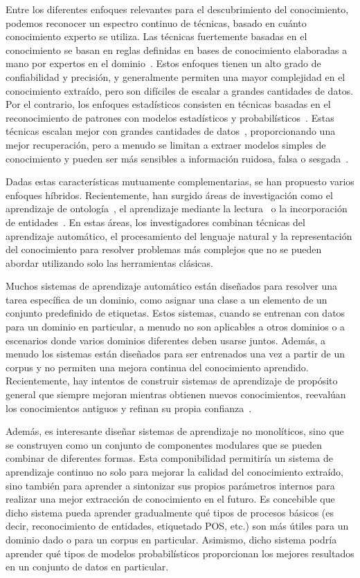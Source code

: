 Entre los diferentes enfoques relevantes para el descubrimiento del conocimiento, podemos reconocer un espectro continuo de técnicas, basado en cuánto conocimiento experto se utiliza. Las técnicas fuertemente basadas en el conocimiento se basan en reglas definidas en bases de conocimiento elaboradas a mano por expertos en el dominio~\cite{chandrasekaran1986generic}. Estos enfoques tienen un alto grado de confiabilidad y precisión, y generalmente permiten una mayor complejidad en el conocimiento extraído, pero son difíciles de escalar a grandes cantidades de datos. Por el contrario, los enfoques estadísticos consisten en técnicas basadas en el reconocimiento de patrones con modelos estadísticos y probabilísticos~\cite{kevin2012machine}. Estas técnicas escalan mejor con grandes cantidades de datos~\cite{le2013building}, proporcionando una mejor recuperación, pero a menudo se limitan a extraer modelos simples de conocimiento y pueden ser más sensibles a información ruidosa, falsa o sesgada~\cite{bolukbasi2016man}.

Dadas estas características mutuamente complementarias, se han propuesto varios enfoques híbridos. Recientemente, han surgido áreas de investigación como el aprendizaje de ontología~\cite{cimiano2009ontology}, el aprendizaje mediante la lectura~\cite{barker2007learning} o la incorporación de entidades~\cite{hu2015entity}.
En estas áreas, los investigadores combinan técnicas del aprendizaje automático, el procesamiento del lenguaje natural y la representación del conocimiento para resolver problemas más complejos que no se pueden abordar utilizando solo las herramientas clásicas.

Muchos sistemas de aprendizaje automático están diseñados para resolver una tarea específica de un dominio, como asignar una clase a un elemento de un conjunto predefinido de etiquetas. Estos sistemas, cuando se entrenan con datos para un dominio en particular, a menudo no son aplicables a otros dominios o a escenarios donde varios dominios diferentes deben usarse juntos. Además, a menudo los sistemas están diseñados para ser entrenados una vez a partir de un corpus y no permiten una mejora continua del conocimiento aprendido. Recientemente, hay intentos de construir sistemas de aprendizaje de propósito general que siempre mejoran mientras obtienen nuevos conocimientos, reevalúan los conocimientos antiguos y refinan su propia confianza~\cite{mitchell2015never}.

Además, es interesante diseñar sistemas de aprendizaje no monolíticos, sino que se construyen como un conjunto de componentes modulares que se pueden combinar de diferentes formas. Esta componibilidad permitiría un sistema de aprendizaje continuo no solo para mejorar la calidad del conocimiento extraído, sino también para aprender a sintonizar sus propios parámetros internos para realizar una mejor extracción de conocimiento en el futuro. Es concebible que dicho sistema pueda aprender gradualmente qué tipos de procesos básicos (es decir, reconocimiento de entidades, etiquetado POS, etc.) son más útiles para un dominio dado o para un corpus en particular. Asimismo, dicho sistema podría aprender qué tipos de modelos probabilísticos proporcionan los mejores resultados en un conjunto de datos en particular.

